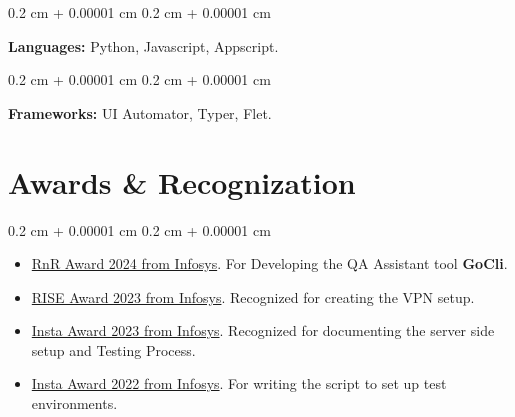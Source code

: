 \documentclass[10pt, letterpaper]{article}
\newenvironment{highlightsforbulletentries}{
    \begin{itemize}[
        topsep=0.10 cm,
        parsep=0.10 cm,
        partopsep=0pt,
        itemsep=0pt,
        leftmargin=10pt
    ]
}{
    \end{itemize}
} %
\newenvironment{onecolentry}{
    \begin{adjustwidth}{
        0.2 cm + 0.00001 cm
    }{
        0.2 cm + 0.00001 cm
    }
}{
    \end{adjustwidth}
} %
\begin{document}
        \vspace{0.2 cm}

        \begin{onecolentry}
            \textbf{Languages:} Python, Javascript, Appscript.
        \end{onecolentry}

        \vspace{0.2 cm}

        \begin{onecolentry}
            \textbf{Frameworks:} UI Automator, Typer, Flet.
        \end{onecolentry}


    
    \section{Awards \& Recognization}

    \begin{onecolentry}
        \begin{highlightsforbulletentries}


        \item \href{https://media.licdn.com/dms/image/v2/D5622AQEA64bWlBwoig/feedshare-shrink_1280/feedshare-shrink_1280/0/1717684202883?e=1737590400&v=beta&t=W4KZ_pPUkMEDnSMrJRxHFqpt7-938ofG43Ub-g3rlz8}{RnR Award 2024 from Infosys}. For Developing the QA Assistant tool \textbf{GoCli}.

        \item \href{https://media.licdn.com/dms/image/v2/D5622AQF6D1znOZFBqw/feedshare-shrink_2048_1536/feedshare-shrink_2048_1536/0/1712853041179?e=1737590400&v=beta&t=KZFeMril86E8BwjlAOnaFXRJV_LUO2CByhGHJC6Z35Y}{RISE Award 2023 from Infosys}. Recognized for creating the VPN setup.

        \item \href{https://media.licdn.com/dms/image/v2/D5622AQF3kXcN1EZ9yA/feedshare-shrink_2048_1536/feedshare-shrink_2048_1536/0/1684258474806?e=1737590400&v=beta&t=m-fkwha-bnBCg_boQJ4Lfdsi8VQKByiYz4B5Jm4329o}{Insta Award 2023 from Infosys}. Recognized for documenting the server side setup and Testing Process.

        \item \href{https://media.licdn.com/dms/image/v2/C5622AQGmS4TywZYO7Q/feedshare-shrink_1280/feedshare-shrink_1280/0/1669996323050?e=1737590400&v=beta&t=4lxGJdI1SJRUydLBf9mb0Z3w78_o66TZCvytgSi18MI}{Insta Award 2022 from Infosys}. For writing the script to set up test environments.


        \end{highlightsforbulletentries}
    \end{onecolentry}
\end{document}
